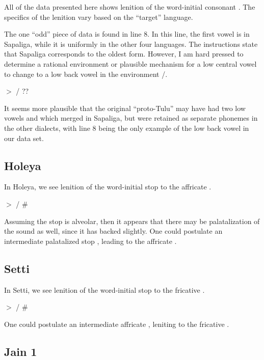 \documentclass[12pt]{article}
\begin{document}
All of the data presented here shows lenition of the word-initial consonant . The specifics of the lenition vary based on the ``target'' language.

The one ``odd'' piece of data is found in line 8. In this line, the first vowel is  in Sapaliga, while it is uniformly  in the other four languages. The instructions state that Sapaliga corresponds to the oldest form. However, I am hard pressed to determine a rational environment or plausible mechanism for a low central vowel  to change to a low back vowel  in the environment /.
\begin{center}
 $>$  / \und {} \; ??
\end{center}
It seems more plausible that the original ``proto-Tulu'' may have had two low vowels  and  which merged in Sapaliga, but were retained as separate phonemes in the other dialects, with line 8 being the only example of the low back vowel in our data set.

\subsection{Holeya}

In Holeya, we see lenition of the word-initial stop  to the affricate .
\begin{center}
 $>$  / \#\und 
\end{center}
Assuming the stop is alveolar, then it appears that there may be palatalization of the sound as well, since it has backed slightly. One could postulate an intermediate palatalized stop , leading to the affricate .

\subsection{Setti}

In Setti, we see lenition of the word-initial stop  to the fricative .
\begin{center}
 $>$  / \#\und
\end{center}
One could postulate an intermediate affricate , leniting to the fricative .

\subsection{Jain 1}
\end{document}
